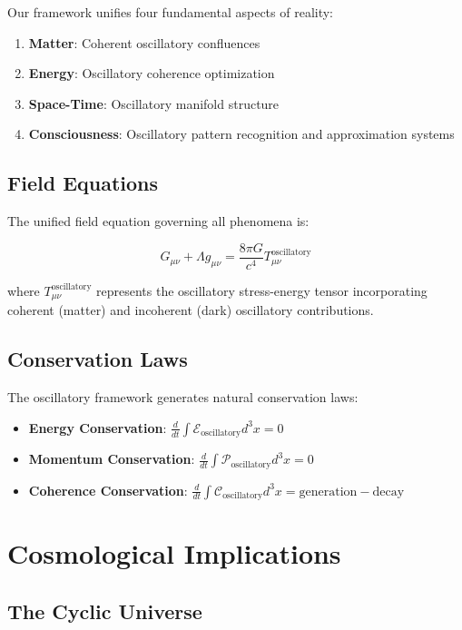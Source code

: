 \documentclass[11pt]{article}
\theoremstyle{remark}
\begin{document}
Our framework unifies four fundamental aspects of reality:

\begin{enumerate}
\item \textbf{Matter}: Coherent oscillatory confluences
\item \textbf{Energy}: Oscillatory coherence optimization
\item \textbf{Space-Time}: Oscillatory manifold structure
\item \textbf{Consciousness}: Oscillatory pattern recognition and approximation systems
\end{enumerate}

\subsection{Field Equations}

The unified field equation governing all phenomena is:

$$G_{\mu\nu} + \Lambda g_{\mu\nu} = \frac{8\pi G}{c^4} T_{\mu\nu}^{\text{oscillatory}}$$

where $T_{\mu\nu}^{\text{oscillatory}}$ represents the oscillatory stress-energy tensor incorporating coherent (matter) and incoherent (dark) oscillatory contributions.

\subsection{Conservation Laws}

The oscillatory framework generates natural conservation laws:

\begin{itemize}
\item \textbf{Energy Conservation}: $\frac{d}{dt}\int \mathcal{E}_{\text{oscillatory}} d^3x = 0$
\item \textbf{Momentum Conservation}: $\frac{d}{dt}\int \mathcal{P}_{\text{oscillatory}} d^3x = 0$
\item \textbf{Coherence Conservation}: $\frac{d}{dt}\int \mathcal{C}_{\text{oscillatory}} d^3x = \text{generation} - \text{decay}$
\end{itemize}

\section{Cosmological Implications}

\subsection{The Cyclic Universe}
\end{document}
